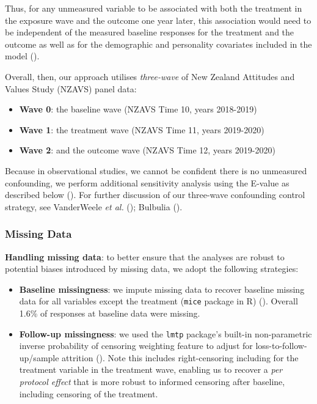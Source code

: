 \documentclass[
  singlecolumn]{article}
\begin{document}
Thus, for any unmeasured variable to be associated with both the
treatment in the exposure wave and the outcome one year later, this
association would need to be independent of the measured baseline
responses for the treatment and the outcome as well as for the
demographic and personality covariates included in the model
().

Overall, then, our approach utilises \emph{three-wave} of New Zealand
Attitudes and Values Study (NZAVS) panel data:

\begin{itemize}
\item
  \textbf{Wave 0}: the baseline wave (NZAVS Time 10, years 2018-2019)
\item
  \textbf{Wave 1}: the treatment wave (NZAVS Time 11, years 2019-2020)
\item
  \textbf{Wave 2}: and the outcome wave (NZAVS Time 12, years 2019-2020)
\end{itemize}

Because in observational studies, we cannot be confident there is no
unmeasured confounding, we perform additional sensitivity analysis using
the E-value as described below
(). For further
discussion of our three-wave confounding control strategy, see
VanderWeele \emph{et al.} ();
Bulbulia ().

\subsubsection{Missing Data}\label{missing-data}

\textbf{Handling missing data}: to better ensure that the analyses are
robust to potential biases introduced by missing data, we adopt the
following strategies:

\begin{itemize}
\item
  \textbf{Baseline missingness}: we impute missing data to recover
  baseline missing data for all variables except the treatment
  (\texttt{mice} package in R) (). Overall 1.6\% of responses at baseline data were missing.
\item
  \textbf{Follow-up missingness}: we used the \texttt{lmtp} package's
  built-in non-parametric inverse probability of censoring weighting
  feature to adjust for loss-to-follow-up/sample attrition
  (). Note this
  includes right-censoring including for the treatment variable in the
  treatment wave, enabling us to recover a \emph{per protocol effect}
  that is more robust to informed censoring after baseline, including
  censoring of the treatment.
\end{itemize}
\end{document}
